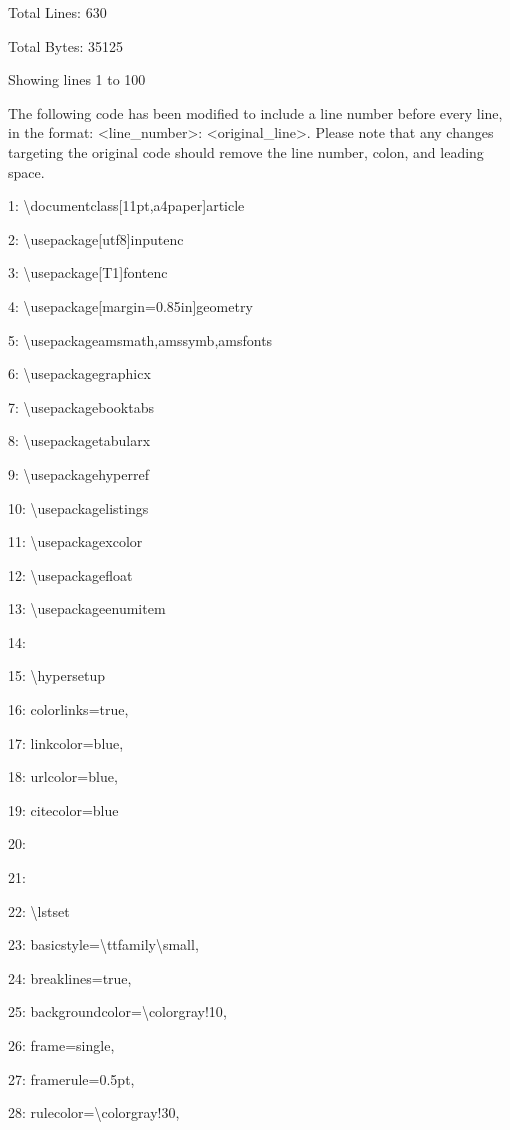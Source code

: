 \documentclass[11pt,a4paper]{article}
\begin{document}
{Total Lines: 630

Total Bytes: 35125

Showing lines 1 to 100

The following code has been modified to include a line number before every line, in the format: <line\_number>: <original\_line>. Please note that any changes targeting the original code should remove the line number, colon, and leading space.

1: \textbackslash{}documentclass[11pt,a4paper]{article}

2: \textbackslash{}usepackage[utf8]{inputenc}

3: \textbackslash{}usepackage[T1]{fontenc}

4: \textbackslash{}usepackage[margin=0.85in]{geometry}

5: \textbackslash{}usepackage{amsmath,amssymb,amsfonts}

6: \textbackslash{}usepackage{graphicx}

7: \textbackslash{}usepackage{booktabs}

8: \textbackslash{}usepackage{tabularx}

9: \textbackslash{}usepackage{hyperref}

10: \textbackslash{}usepackage{listings}

11: \textbackslash{}usepackage{xcolor}

12: \textbackslash{}usepackage{float}

13: \textbackslash{}usepackage{enumitem}

14:

15: \textbackslash{}hypersetup{

16:     colorlinks=true,

17:     linkcolor=blue,

18:     urlcolor=blue,

19:     citecolor=blue

20: }

21:

22: \textbackslash{}lstset{

23:     basicstyle=\textbackslash{}ttfamily\textbackslash{}small,

24:     breaklines=true,

25:     backgroundcolor=\textbackslash{}color{gray!10},

26:     frame=single,

27:     framerule=0.5pt,

28:     rulecolor=\textbackslash{}color{gray!30},

}}
\end{document}
